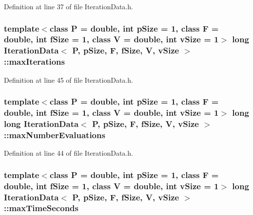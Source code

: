 Definition at line 37 of file Iteration\+Data.\+h.

\subsubsection[{\texorpdfstring{max\+Iterations}{maxIterations}}]{\setlength{\rightskip}{0pt plus 5cm}template$<$class P = double, int p\+Size = 1, class F = double, int f\+Size = 1, class V = double, int v\+Size = 1$>$ long {\bf Iteration\+Data}$<$ P, p\+Size, F, f\+Size, V, v\+Size $>$\+::max\+Iterations}\hypertarget{structIterationData_a9baa0b37d2e5b38e5e82d3c6fc8dcacf}{}\label{structIterationData_a9baa0b37d2e5b38e5e82d3c6fc8dcacf}


Definition at line 45 of file Iteration\+Data.\+h.

\subsubsection[{\texorpdfstring{max\+Number\+Evaluations}{maxNumberEvaluations}}]{\setlength{\rightskip}{0pt plus 5cm}template$<$class P = double, int p\+Size = 1, class F = double, int f\+Size = 1, class V = double, int v\+Size = 1$>$ long long {\bf Iteration\+Data}$<$ P, p\+Size, F, f\+Size, V, v\+Size $>$\+::max\+Number\+Evaluations}\hypertarget{structIterationData_a0c2c484b02710ac2e48221114e027dc6}{}\label{structIterationData_a0c2c484b02710ac2e48221114e027dc6}


Definition at line 44 of file Iteration\+Data.\+h.

\subsubsection[{\texorpdfstring{max\+Time\+Seconds}{maxTimeSeconds}}]{\setlength{\rightskip}{0pt plus 5cm}template$<$class P = double, int p\+Size = 1, class F = double, int f\+Size = 1, class V = double, int v\+Size = 1$>$ long {\bf Iteration\+Data}$<$ P, p\+Size, F, f\+Size, V, v\+Size $>$\+::max\+Time\+Seconds}\hypertarget{structIterationData_ad10e22f3597e2ac59de07a3d60ed4eb6}{}\label{structIterationData_ad10e22f3597e2ac59de07a3d60ed4eb6}


